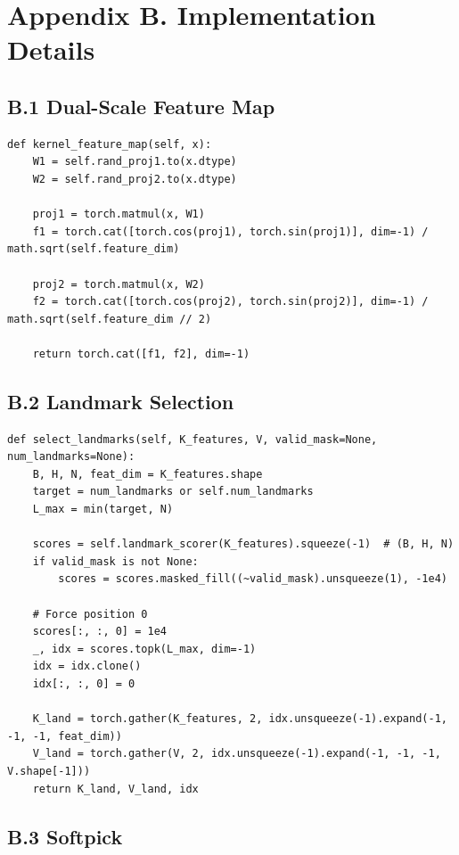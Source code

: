 \section{Appendix B. Implementation Details}

\subsection{B.1 Dual-Scale Feature Map}

\begin{lstlisting}
def kernel_feature_map(self, x):
    W1 = self.rand_proj1.to(x.dtype)
    W2 = self.rand_proj2.to(x.dtype)
    
    proj1 = torch.matmul(x, W1)
    f1 = torch.cat([torch.cos(proj1), torch.sin(proj1)], dim=-1) / math.sqrt(self.feature_dim)
    
    proj2 = torch.matmul(x, W2)
    f2 = torch.cat([torch.cos(proj2), torch.sin(proj2)], dim=-1) / math.sqrt(self.feature_dim // 2)
    
    return torch.cat([f1, f2], dim=-1)
\end{lstlisting}

\subsection{B.2 Landmark Selection}

\begin{lstlisting}
def select_landmarks(self, K_features, V, valid_mask=None, num_landmarks=None):
    B, H, N, feat_dim = K_features.shape
    target = num_landmarks or self.num_landmarks
    L_max = min(target, N)
    
    scores = self.landmark_scorer(K_features).squeeze(-1)  # (B, H, N)
    if valid_mask is not None:
        scores = scores.masked_fill((~valid_mask).unsqueeze(1), -1e4)
    
    # Force position 0
    scores[:, :, 0] = 1e4
    _, idx = scores.topk(L_max, dim=-1)
    idx = idx.clone()
    idx[:, :, 0] = 0
    
    K_land = torch.gather(K_features, 2, idx.unsqueeze(-1).expand(-1, -1, -1, feat_dim))
    V_land = torch.gather(V, 2, idx.unsqueeze(-1).expand(-1, -1, -1, V.shape[-1]))
    return K_land, V_land, idx
\end{lstlisting}

\subsection{B.3 Softpick}

